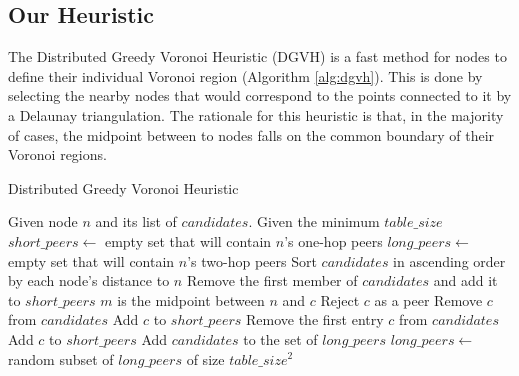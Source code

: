\documentclass[11pt, conference, letterpaper]{IEEEtran}
\begin{document}
\subsection{Our Heuristic}




The Distributed Greedy Voronoi Heuristic (DGVH) is a fast method for nodes to define their individual Voronoi region (Algorithm \ref{alg:dgvh}). 
This is done by selecting the nearby nodes that would correspond to the points connected to it by a Delaunay triangulation.
The rationale for this heuristic is that, in the majority of cases, the midpoint between to nodes falls on the common boundary of their Voronoi regions.




\begin{algorithm} %
\caption{Distributed Greedy Voronoi Heuristic}
\label{alg:dgvh}
\begin{algorithmic}[1]  %
	 \STATE Given node $n$ and its list of $candidates$.
   	 \STATE Given the minimum $table\_size$
    \STATE $short\_peers \leftarrow$ empty set that will contain $n$'s one-hop peers
	 \STATE $long\_peers \leftarrow$ empty set that will contain $n$'s two-hop peers    
    \STATE Sort $candidates$ in ascending order by each node's distance to $n$
    \STATE Remove the first member of $candidates$ and add it to $short\_peers$
    	\STATE $m$ is the midpoint between $n$ and $c$
        	\STATE Reject $c$ as a peer
        \ELSE
        	\STATE Remove $c$ from $candidates$
        	\STATE Add $c$ to $short\_peers$
        \ENDIF
    \ENDFOR
    	\STATE Remove the first entry $c$ from $candidates$
    	\STATE Add $c$ to $short\_peers$
    \ENDWHILE
    	\STATE Add $candidates$ to the set of $long\_peers$	
        		\STATE $long\_peers \leftarrow$ random subset of $long\_peers$ of size $table\_size^2$
      \ENDIF
\end{algorithmic}
\end{algorithm}
\end{document}

